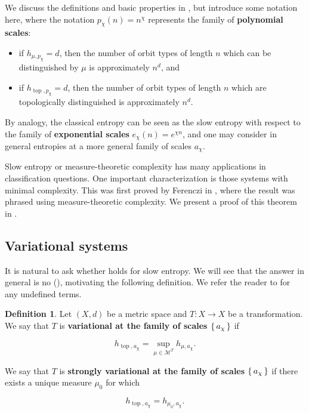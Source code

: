 \documentclass[oneside]{amsart}
\theoremstyle{plain}
\theoremstyle{definition}
\newtheorem{DEF}[THM]{Definition}
\newcommand{\<}{\langle}
\renewcommand{\>}{\rangle}
\newcommand{\topo}{\operatorname{top}}
\renewcommand{\|}{|\!|} %
\begin{document}
We discuss the definitions and basic properties in  , but introduce some notation here, where the notation $p_\chi(n) = n^\chi$ represents the family of {\bf polynomial scales}:

\begin{itemize}
    \item if $h_{\mu,p_\chi} = d$, then the number of orbit types of length $n$ which can be distinguished by $\mu$ is approximately $n^d$, and
    \item if $h_{\topo,p_\chi} = d$, then the number of orbit types of length $n$ which are topologically distinguished is approximately $n^d$.
\end{itemize}

By analogy, the classical entropy can be seen as the slow entropy with respect to the family of {\bf exponential scales} $e_\chi(n) = e^{\chi n}$, and one may consider in general entropies at a more general family of scales $a_\chi$.

Slow entropy or measure-theoretic complexity has many applications in classification questions. One important characterization is those systems with minimal complexity. This was first proved by Ferenczi in \cite{Ferenczi0}, where the result was phrased using measure-theoretic complexity. We present a proof of this theorem in  .

\subsection{Variational systems}

It is natural to ask whether  holds for slow entropy. We will see that the answer in general is no (), motivating the following definition. We refer the reader to  for any undefined terms.

\begin{DEF}
    Let $(X,d)$ be a metric space and $T : X \to X$ be a transformation. We say that $T$ is {\bf variational at the family of scales $\set{a_\chi}$} if

    \[h_{\topo,a_\chi} = \sup_{\mu \in \mathcal{M}^T} h_{\mu,a_\chi}.\]

    We say that $T$ is {\bf strongly variational at the family of scales $\set{a_\chi}$} if there exists a unique measure $\mu_0$ for which 

    \[ h_{\topo,a_\chi} = h_{\mu_0,a_\chi}.\]
\end{DEF}
\end{document}
